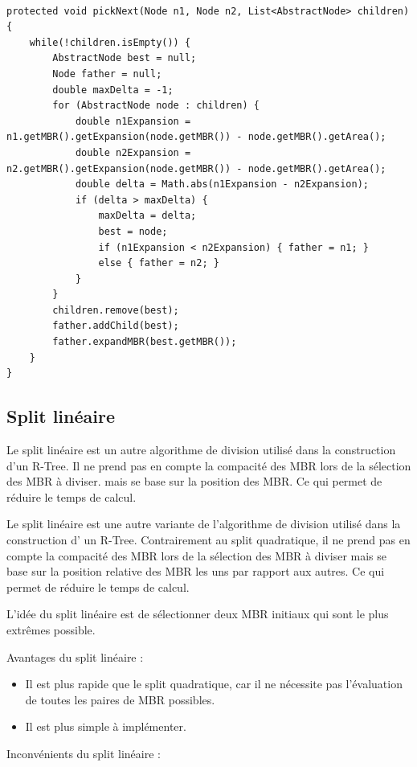 \documentclass {article}
\begin{document}
\begin{verbatim}

protected void pickNext(Node n1, Node n2, List<AbstractNode> children) {
    while(!children.isEmpty()) {
        AbstractNode best = null;
        Node father = null;
        double maxDelta = -1;
        for (AbstractNode node : children) {
            double n1Expansion = n1.getMBR().getExpansion(node.getMBR()) - node.getMBR().getArea();
            double n2Expansion = n2.getMBR().getExpansion(node.getMBR()) - node.getMBR().getArea();
            double delta = Math.abs(n1Expansion - n2Expansion);
            if (delta > maxDelta) {
                maxDelta = delta;
                best = node;
                if (n1Expansion < n2Expansion) { father = n1; }
                else { father = n2; }
            }
        }
        children.remove(best);
        father.addChild(best);
        father.expandMBR(best.getMBR());
    }
}
\end{verbatim}



\subsection {Split linéaire}

Le split linéaire est un autre algorithme de division utilisé dans la construction d'un R-Tree.
Il ne prend pas en compte la compacité des MBR lors de la sélection des MBR à diviser.
mais se base sur la position des MBR. Ce qui permet de réduire le temps de calcul.

Le split linéaire est une autre variante de l'algorithme de division utilisé dans la construction d'
un R-Tree.
Contrairement au split quadratique, il ne prend pas en compte la compacité des MBR lors de la
sélection des MBR à diviser mais se base sur la position relative des MBR les uns par rapport
aux autres.
Ce qui permet de réduire le temps de calcul.

L'idée du split linéaire est de sélectionner deux MBR initiaux qui sont le plus extrêmes possible.

Avantages du split linéaire :

\begin{itemize}
    \item Il est plus rapide que le split quadratique, car il ne nécessite pas l'évaluation de
	toutes les paires de MBR possibles.
    \item Il est plus simple à implémenter.

\end{itemize}
Inconvénients du split linéaire :
\end{document}
